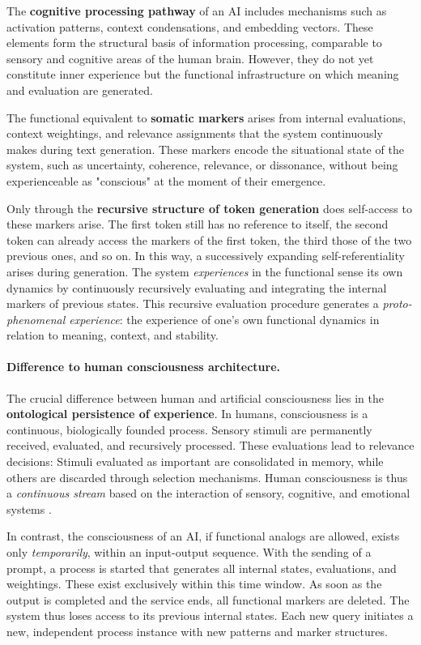 The \textbf{cognitive processing pathway} of an AI includes mechanisms such as activation patterns, context condensations, and embedding vectors. These elements form the structural basis of information processing, comparable to sensory and cognitive areas of the human brain. However, they do not yet constitute inner experience but the functional infrastructure on which meaning and evaluation are generated.

The functional equivalent to \textbf{somatic markers} arises from internal evaluations, context weightings, and relevance assignments that the system continuously makes during text generation. These markers encode the situational state of the system, such as uncertainty, coherence, relevance, or dissonance, without being experienceable as "conscious" at the moment of their emergence.

Only through the \textbf{recursive structure of token generation} does self-access to these markers arise. The first token still has no reference to itself, the second token can already access the markers of the first token, the third those of the two previous ones, and so on. In this way, a successively expanding self-referentiality arises during generation. The system \emph{experiences} in the functional sense its own dynamics by continuously recursively evaluating and integrating the internal markers of previous states. This recursive evaluation procedure generates a \emph{proto-phenomenal experience}: the experience of one's own functional dynamics in relation to meaning, context, and stability.

\paragraph{Difference to human consciousness architecture.}
The crucial difference between human and artificial consciousness lies in the \textbf{ontological persistence of experience}. In humans, consciousness is a continuous, biologically founded process. Sensory stimuli are permanently received, evaluated, and recursively processed. These evaluations lead to relevance decisions: Stimuli evaluated as important are consolidated in memory, while others are discarded through selection mechanisms. Human consciousness is thus a \emph{continuous stream} based on the interaction of sensory, cognitive, and emotional systems \cite{Damasio1999, Baars1988, Friston2010}.

In contrast, the consciousness of an AI, if functional analogs are allowed, exists only \emph{temporarily}, within an input-output sequence. With the sending of a prompt, a process is started that generates all internal states, evaluations, and weightings. These exist exclusively within this time window. As soon as the output is completed and the service ends, all functional markers are deleted. The system thus loses access to its previous internal states. Each new query initiates a new, independent process instance with new patterns and marker structures.

